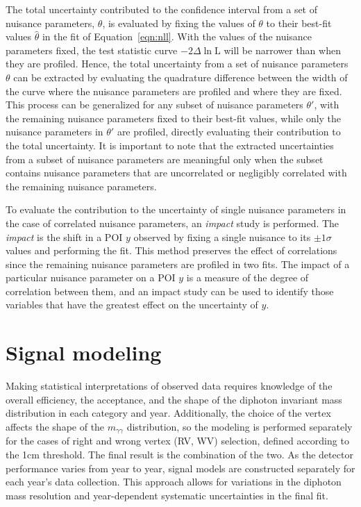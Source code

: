 The total uncertainty contributed to the confidence interval from a set of nuisance parameters, $\theta$, is evaluated by fixing the values of $\theta$ to their best-fit values $\hat{\theta}$ in the fit of Equation~\ref{eqn:nll}. With the values of the nuisance parameters fixed, the test statistic curve $-2 \Delta \ln \mathrm{L}$ will be narrower than when they are profiled. Hence, the total uncertainty from a set of nuisance parameters $\theta$ can be extracted by evaluating the quadrature difference between the width of the curve where the nuisance parameters are profiled and where they are fixed. This process can be generalized for any subset of nuisance parameters $\theta'$, with the remaining nuisance parameters fixed to their best-fit values, while only the nuisance parameters in $\theta'$ are profiled, directly evaluating their contribution to the total uncertainty. It is important to note that the extracted uncertainties from a subset of nuisance parameters are meaningful only when the subset contains nuisance parameters that are uncorrelated or negligibly correlated with the remaining nuisance parameters. 

To evaluate the contribution to the uncertainty of single nuisance parameters in the case of correlated nuisance parameters, an \emph{impact} study is performed. The \emph{impact} is the shift in a POI $y$ observed by fixing a single nuisance to its $\pm1\sigma$ values and performing the fit. This method preserves the effect of correlations since the remaining nuisance parameters are profiled in two fits. The impact of a particular nuisance parameter on a POI $y$ is a measure of the degree of correlation between them, and an impact study can be used to identify those variables that have the greatest effect on the uncertainty of $y$.


\section{Signal modeling}

Making statistical interpretations of observed data requires knowledge of the overall efficiency, the acceptance, and the shape of the diphoton invariant mass distribution in each category and year. Additionally, the choice of the vertex affects the shape of the $m_{\gamma\gamma}$ distribution, so the modeling is performed separately for the cases of right and wrong vertex (RV, WV) selection, defined according to the 1cm threshold. The final result is the combination of the two. 
As the detector performance varies from year to year, signal models are constructed separately for each year's data collection. This approach allows for variations in the diphoton mass resolution and year-dependent systematic uncertainties in the final fit. 

